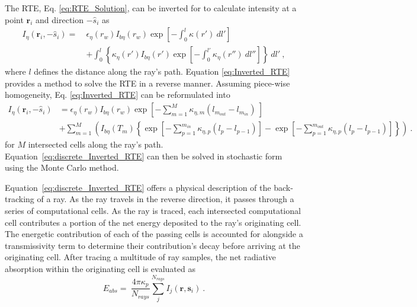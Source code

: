 The RTE, Eq. \ref{eq:RTE_Solution}, can be inverted for to calculate intensity at a point $\textbf{r}_i$ and direction $-\hat{s}_i$ as
\begin{equation}
    \begin{aligned}
    I_\eta{}(\textbf{r}_i,-\hat{s}_i) =~&\epsilon{}_\eta{}(r_w)I_{b\eta{}}(r_w)\exp{\left[-\int_0^l\kappa{}(r')~dl'\right]}\\
    &+\int_{0}^{l}{ \left\{ \kappa_\eta(r')I_{b\eta}(r')\exp{\left[-\int_0^{l'}\kappa_\eta(r'')~dl''\right]} \right\}}~dl'~,
    \label{eq:Inverted_RTE}
    \end{aligned}
\end{equation}
where $l$ defines the distance along the ray's path. Equation \ref{eq:Inverted_RTE} provides a method to solve the RTE in a reverse manner.
Assuming piece-wise homogeneity, Eq. \ref{eq:Inverted_RTE} can be reformulated into
\begin{equation}
    \begin{aligned}
    I_\eta{}(\textbf{r}_i,-\hat{s}_i)& = \epsilon{}_\eta{}(r_w)I_{b\eta{}}(r_w)\exp{\left[-\sum_{m=1}^M\kappa{}_{\eta{},m}(l_{m_{out}}-l_{m_{in}})~\right]}\\
    &+\sum_{m=1}^M\left( I_{b\eta}(T_m)\left\{ \exp{\left[-\sum_{p=1}^{m_{in}}\kappa{}_{\eta{},p}(l_{p}-l_{p-1})\right]}- \exp{\left[-\sum_{p=1}^{m_{out}}\kappa{}_{\eta{},p}(l_{p}-l_{p-1})\right]} \right\} \right)~.
    \end{aligned}
    \label{eq:discrete_Inverted_RTE}
\end{equation}
for $M$ intersected cells along the ray's path. Equation~\ref{eq:discrete_Inverted_RTE} can then be solved in stochastic form using the Monte Carlo method.

Equation~\ref{eq:discrete_Inverted_RTE} offers a physical description of the back-tracking of a ray.
As the ray travels in the reverse direction, it passes through a series of computational cells. 
As the ray is traced, each intersected computational cell contributes a portion of the net energy deposited to the ray's originating cell. The energetic contribution of each of the passing cells is accounted for alongside a transmissivity term to determine their contribution's decay before arriving at the originating cell.
After tracing a multitude of ray samples, the net radiative absorption within the originating cell is evaluated as
\begin{equation}
    E_{abs}=~\frac{4\pi{}\kappa_p}{N_{rays}}\sum_j^{N_{rays}}I_j(\textbf{r},\textbf{s}_i)~.
    \label{eq:RMCRT_Absorption}
\end{equation}

